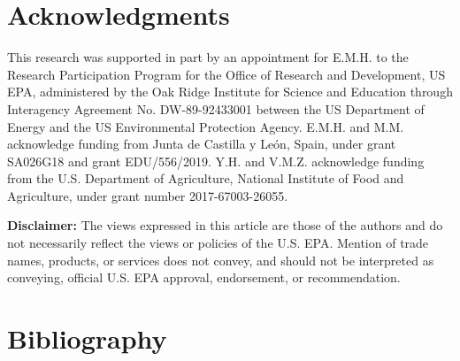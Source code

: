 \begin{refsection}[referencesCh5]
\section*{Acknowledgments} \label{section:Acknowledgments}
This research was supported in part by an appointment for E.M.H. to the Research Participation Program for the Office of Research and Development, US EPA, administered by the Oak Ridge Institute for Science and Education through Interagency Agreement No. DW-89-92433001 between the US Department of Energy and the US Environmental Protection Agency. E.M.H. and M.M. acknowledge funding from Junta de Castilla y Le\'{o}n, Spain, under grant SA026G18 and grant EDU/556/2019. Y.H. and V.M.Z. acknowledge funding from the U.S. Department of Agriculture, National Institute of Food and Agriculture, under grant number 2017-67003-26055.

\textbf{Disclaimer:} The views expressed in this article are those of the authors and do not necessarily reflect the views or policies of the U.S. EPA. Mention of trade names, products, or services does not convey, and should not be interpreted as conveying, official U.S. EPA approval, endorsement, or recommendation.

\section*{Bibliography}

\printbibliography[heading=none]
\end{refsection}